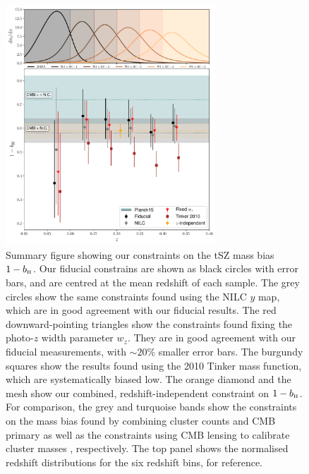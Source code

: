 \documentclass[useAMS,usenatbib]{mn2e}
\def\bH{b_{\scriptscriptstyle\rm H}}
\begin{document}
      \begin{figure}
        \centering
        \includegraphics[width=0.7\textwidth]{bhydro.pdf}
        \caption{Summary figure showing our constraints on the tSZ mass bias $1-\bH$. Our fiducial constrains are shown as black circles with error bars, and are centred at the mean redshift of each sample. The grey circles show the same constraints found using the NILC $y$ map, which are in good agreement with our fiducial results. The red downward-pointing triangles show the constraints found fixing the photo-$z$ width parameter $w_z$. They are in good agreement with our fiducial measurements, with $\sim20\%$ smaller error bars. The burgundy squares show the results found using the 2010 Tinker mass function, which are systematically biased low. The orange diamond and the mesh show our combined, redshift-independent constraint on $1-\bH$. For comparison, the grey and turquoise bands show the constraints on the mass bias found by combining cluster counts and CMB primary \citep{2016A&A...594A..24P} as well as the constraints using CMB lensing to calibrate cluster masses \citep{2019arXiv190407887Z}, respectively. The top panel shows the normalised redshift distributions for the six redshift bins, for reference.}
        \label{fig:bh}
      \end{figure}
\end{document}
